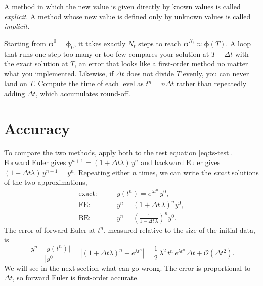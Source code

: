 \begin{remark}
A method in which the new value is given
directly by known values is called \emph{explicit}. A method whose new value is
defined only by unknown values is called \emph{implicit}.
\end{remark}


\begin{remark}
Starting from $\boldsymbol{\phi}^0 = \boldsymbol{\phi}_0$, it takes exactly
$N_t$ steps to reach $\boldsymbol{\phi}^{N_t} \approx \boldsymbol{\phi}(T)$. A loop that runs one step too many or too
few compares your solution at $T \pm \Delta t$ with the exact solution at $T$, an error that looks like a first-order
method no matter what you implemented. Likewise, if $\Delta t$ does not divide $T$
evenly, you can never land on $T$. Compute the time of each level as $t^n = n\Delta t$
rather than repeatedly adding $\Delta t$, which accumulates round-off.
\end{remark}


\section{Accuracy}
\label{sec:ts-accuracy}

To compare the two methods, apply both to the test equation \eqref{eq:ts-test}. Forward Euler gives
$y^{n+1} = (1 + \Delta t\lambda)\,y^n$ and backward Euler gives
$(1-\Delta t\lambda)\,y^{n+1} = y^n$. Repeating either $n$ times, we can
write the \emph{exact} solutions of the two approximations,
\begin{align}
  \text{exact:} \qquad & y(t^n) = e^{\lambda t^n}\,y^0, \label{eq:ts-exactscalar}\\
  \text{FE:}    \qquad & y^n = \left(1 + \Delta t\,\lambda\right)^n y^0, \label{eq:ts-FEscalar}\\
  \text{BE:}    \qquad & y^n = \left(\frac{1}{1 - \Delta t\,\lambda}\right)^n y^0. \label{eq:ts-BEscalar}
\end{align}
The error of forward Euler at $t^n$, measured relative to the size of the initial data, is
\begin{equation}
  \frac{|y^n - y(t^n)|}{|y^0|} = \left|\left(1 + \Delta t\lambda\right)^n - e^{\lambda t^n}\right|
  = \frac12\,\lambda^2\,t^n\,e^{\lambda t^n}\,\Delta t + \mathcal{O}(\Delta t^2).
  \label{eq:ts-FEerror}
\end{equation}
We will see in the next section what can go wrong.
The error is proportional to $\Delta t$, so forward Euler is first-order
accurate.



